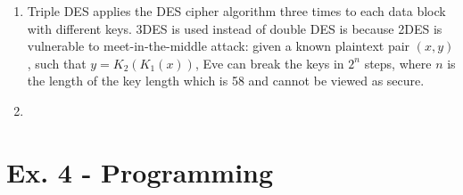 \documentclass[11pt,a4paper]{article}
\begin{document}
\begin{enumerate}
	\item Triple DES applies the DES cipher algorithm three times to each data block with different keys. 3DES is used instead of double DES is because 2DES is vulnerable to meet-in-the-middle attack: given a known plaintext pair $(x,y)$, such that $y = K_{2}(K_{1}(x))$, Eve can break the keys in $2^{n}$ steps, where $n$ is the length of the key length which is 58 and cannot be viewed as secure.
	
	\item
\end{enumerate}

\section*{Ex. 4 - Programming}
\end{document}
